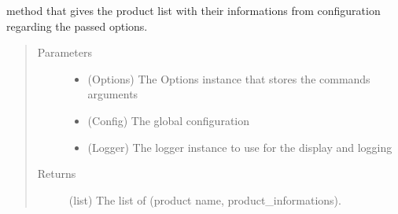 \documentclass[a4paper,10pt,english]{sphinxmanual}
\begin{document}

\begin{fulllineitems}
\label{\detokenize{apidoc_commands/commands:commands.compile.extend_with_fathers}}
\end{fulllineitems}


\begin{fulllineitems}
\label{\detokenize{apidoc_commands/commands:commands.compile.get_children}}
\end{fulllineitems}


\begin{fulllineitems}
\label{\detokenize{apidoc_commands/commands:commands.compile.get_products_list}}
method that gives the product list with their informations from 
configuration regarding the passed options.
\begin{quote}\begin{description}
\item[{Parameters}] \leavevmode\begin{itemize}
\item {} 
 \textendash{} (Options) 
The Options instance that stores the commands arguments

\item {} 
 \textendash{} (Config) The global configuration

\item {} 
 \textendash{} (Logger) 
The logger instance to use for the display and logging

\end{itemize}

\item[{Returns}] \leavevmode
(list) The list of (product name, product\_informations).

\end{description}\end{quote}

\end{fulllineitems}
\end{document}
